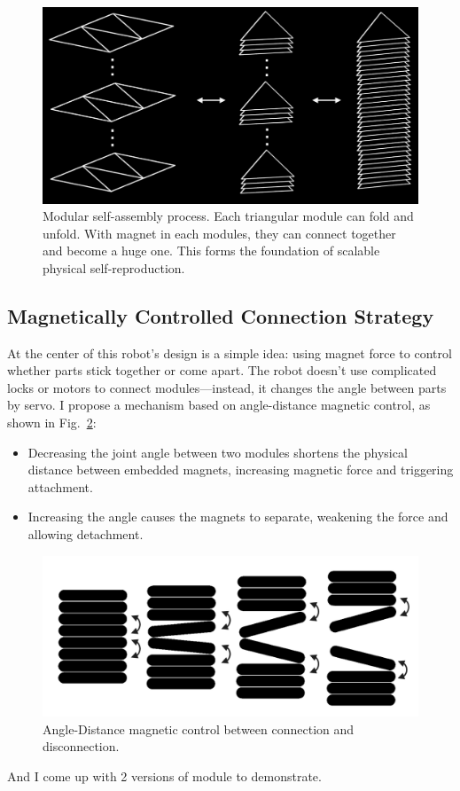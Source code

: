 \documentclass[lettersize,journal]{IEEEtran}
\begin{document}
\begin{figure}[H]
    \centering
    \includegraphics[width=0.7\linewidth]{folding.png}
    \caption{Modular self-assembly process. Each triangular module can fold and unfold. With magnet in each modules, they can connect together and become a huge one. This forms the foundation of scalable physical self-reproduction.}
    \label{fig:folding}
\end{figure}

\subsection{Magnetically Controlled Connection Strategy}
At the center of this robot's design is a simple idea: using magnet force to control whether parts stick together or come apart. The robot doesn’t use complicated locks or motors to connect modules—instead, it changes the angle between parts by servo. I propose a mechanism based on angle-distance magnetic control, as shown in Fig.~\ref{fig:connection-desconnection}:
\begin{itemize}
    \item Decreasing the joint angle between two modules shortens the physical distance between embedded magnets, increasing magnetic force and triggering attachment.
    \item Increasing the angle causes the magnets to separate, weakening the force and allowing detachment.
\end{itemize}
\begin{figure}[H]
    \centering
    \includegraphics[width=0.7\linewidth]{connection-desconnection.png}
    \caption{Angle-Distance magnetic control between connection and disconnection.}
    \label{fig:connection-desconnection}
\end{figure}
And I come up with 2 versions of module to demonstrate.
\end{document}
